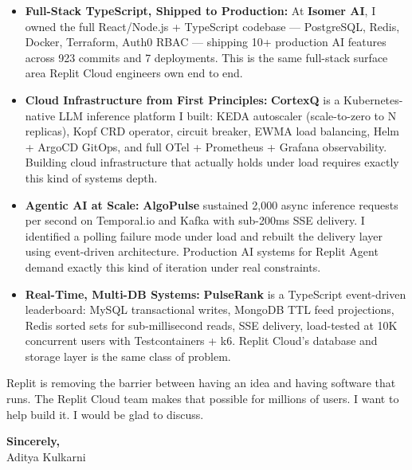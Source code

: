 \documentclass[11pt,letterpaper]{article}
\begin{document}
\begin{itemize}[leftmargin=*, itemsep=3pt, label={\color{ReplitOrange}\faAngleRight}]
    \item \textbf{Full-Stack TypeScript, Shipped to Production:} At \textbf{Isomer AI}, I owned the full React/Node.js + TypeScript codebase --- PostgreSQL, Redis, Docker, Terraform, Auth0 RBAC --- shipping 10+ production AI features across 923 commits and 7 deployments. This is the same full-stack surface area Replit Cloud engineers own end to end.

    \item \textbf{Cloud Infrastructure from First Principles:} \textbf{CortexQ} is a Kubernetes-native LLM inference platform I built: KEDA autoscaler (scale-to-zero to N replicas), Kopf CRD operator, circuit breaker, EWMA load balancing, Helm + ArgoCD GitOps, and full OTel + Prometheus + Grafana observability. Building cloud infrastructure that actually holds under load requires exactly this kind of systems depth.

    \item \textbf{Agentic AI at Scale:} \textbf{AlgoPulse} sustained 2,000 async inference requests per second on Temporal.io and Kafka with sub-200ms SSE delivery. I identified a polling failure mode under load and rebuilt the delivery layer using event-driven architecture. Production AI systems for Replit Agent demand exactly this kind of iteration under real constraints.

    \item \textbf{Real-Time, Multi-DB Systems:} \textbf{PulseRank} is a TypeScript event-driven leaderboard: MySQL transactional writes, MongoDB TTL feed projections, Redis sorted sets for sub-millisecond reads, SSE delivery, load-tested at 10K concurrent users with Testcontainers + k6. Replit Cloud's database and storage layer is the same class of problem.
\end{itemize}

\vspace{6pt}

Replit is removing the barrier between having an idea and having software that runs. The Replit Cloud team makes that possible for millions of users. I want to help build it. I would be glad to discuss.

\vspace{12pt}

\textbf{Sincerely,}\\[8pt]
Aditya Kulkarni
\end{document}
